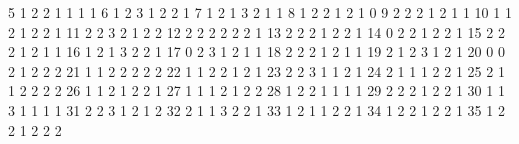 \documentclass[
  letterpaper,
  DIV=11,
  numbers=noendperiod]{scrreprt}
\newenvironment{Shaded}{\begin{snugshade}}{\end{snugshade}}
\newcommand{\NormalTok}[1]{\textcolor[rgb]{0.00,0.23,0.31}{#1}}
\begin{document}
\begin{Shaded}
\begin{Highlighting}[]
\NormalTok{5                1     2         2            1        1         1      1}
\NormalTok{6                1     2         3            1        2         2      1}
\NormalTok{7                1     2         1            3        2         1      1}
\NormalTok{8                1     2         2            1        2         1      0}
\NormalTok{9                2     2         2            1        2         1      1}
\NormalTok{10               1     1         2            1        2         2      1}
\NormalTok{11               2     2         3            2        1         2      2}
\NormalTok{12               2     2         2            2        2         2      1}
\NormalTok{13               2     2         2            1        2         2      1}
\NormalTok{14               0     2         2            1        2         2      1}
\NormalTok{15               2     2         2            1        2         1      1}
\NormalTok{16               1     2         1            3        2         2      1}
\NormalTok{17               0     2         3            1        2         1      1}
\NormalTok{18               2     2         2            1        2         1      1}
\NormalTok{19               2     1         2            3        1         2      1}
\NormalTok{20               0     0         2            1        2         2      2}
\NormalTok{21               1     1         2            2        2         2      2}
\NormalTok{22               1     1         2            2        1         2      1}
\NormalTok{23               2     2         3            1        1         2      1}
\NormalTok{24               2     1         1            1        2         2      1}
\NormalTok{25               2     1         1            2        2         2      2}
\NormalTok{26               1     1         2            1        2         2      1}
\NormalTok{27               1     1         1            2        1         2      2}
\NormalTok{28               1     2         2            1        1         1      1}
\NormalTok{29               2     2         2            1        2         2      1}
\NormalTok{30               1     1         3            1        1         1      1}
\NormalTok{31               2     2         3            1        2         1      2}
\NormalTok{32               2     1         1            3        2         2      1}
\NormalTok{33               1     2         1            1        2         2      1}
\NormalTok{34               1     2         2            1        2         2      1}
\NormalTok{35               1     2         2            1        2         2      2}

\end{Highlighting}
\end{Shaded}
\end{document}

